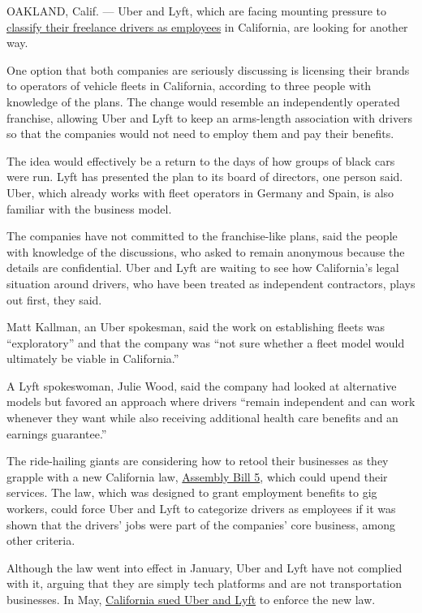 OAKLAND, Calif. --- Uber and Lyft, which are facing mounting pressure to
\href{https://www.nytimes3xbfgragh.onion/2020/08/20/technology/uber-lyft-california-shutdown.html}{classify
their freelance drivers as employees} in California, are looking for
another way.

One option that both companies are seriously discussing is licensing
their brands to operators of vehicle fleets in California, according to
three people with knowledge of the plans. The change would resemble an
independently operated franchise, allowing Uber and Lyft to keep an
arms-length association with drivers so that the companies would not
need to employ them and pay their benefits.

The idea would effectively be a return to the days of how groups of
black cars were run. Lyft has presented the plan to its board of
directors, one person said. Uber, which already works with fleet
operators in Germany and Spain, is also familiar with the business
model.

The companies have not committed to the franchise-like plans, said the
people with knowledge of the discussions, who asked to remain anonymous
because the details are confidential. Uber and Lyft are waiting to see
how California's legal situation around drivers, who have been treated
as independent contractors, plays out first, they said.

Matt Kallman, an Uber spokesman, said the work on establishing fleets
was ``exploratory'' and that the company was ``not sure whether a fleet
model would ultimately be viable in California.''

A Lyft spokeswoman, Julie Wood, said the company had looked at
alternative models but favored an approach where drivers ``remain
independent and can work whenever they want while also receiving
additional health care benefits and an earnings guarantee.''

The ride-hailing giants are considering how to retool their businesses
as they grapple with a new California law,
\href{https://www.nytimes3xbfgragh.onion/2019/12/31/technology/california-freelance-gig-workers.html}{Assembly
Bill 5}, which could upend their services. The law, which was designed
to grant employment benefits to gig workers, could force Uber and Lyft
to categorize drivers as employees if it was shown that the drivers'
jobs were part of the companies' core business, among other criteria.

Although the law went into effect in January, Uber and Lyft have not
complied with it, arguing that they are simply tech platforms and are
not transportation businesses. In May,
\href{https://www.nytimes3xbfgragh.onion/2020/05/05/technology/california-uber-lyft-lawsuit.html}{California
sued Uber and Lyft} to enforce the new law.

